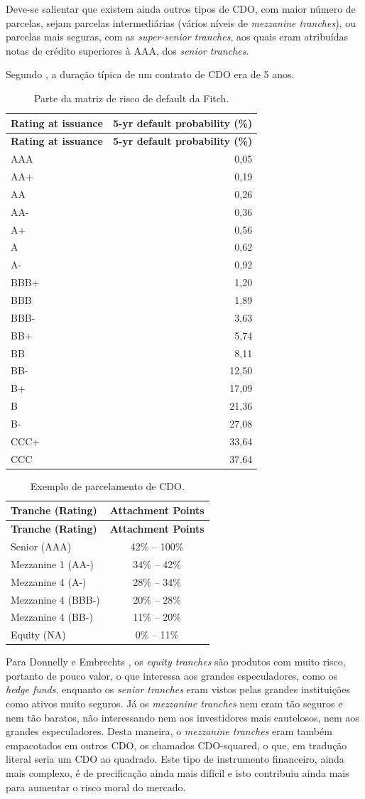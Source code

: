 \documentclass[
	12pt,				%
	oneside,			%
	a4paper,			%
	chapter=TITLE,		%
	section=TITLE,		%
	english,			%
	brazil				%
	]{abntex2}
\begin{document}
Deve-se salientar que existem ainda outros tipos de \gls{CDO}, com maior
número de parcelas, sejam parcelas intermediárias (vários níveis de
\emph{mezzanine tranches}), ou parcelas mais seguras, com as
\emph{super-senior tranches}, aos quais eram atribuídas notas de crédito
superiores à AAA, dos \emph{senior tranches}.

Segundo \textcite{watts}, a duração típica de um contrato de \gls{CDO}
era de 5 anos.
\begin{longtable}[]{@{}lr@{}}
\caption{Parte da matriz de risco de default da Fitch.}\tabularnewline
\toprule
\textbf{Rating at issuance} & \textbf{5-yr default probability
(\%)}\tabularnewline
\midrule
\endfirsthead
\toprule
\textbf{Rating at issuance} & \textbf{5-yr default probability
(\%)}\tabularnewline
\midrule
\endhead
AAA & 0,05\tabularnewline
AA+ & 0,19\tabularnewline
AA & 0,26\tabularnewline
AA- & 0,36\tabularnewline
A+ & 0,56\tabularnewline
A & 0,62\tabularnewline
A- & 0,92\tabularnewline
BBB+ & 1,20\tabularnewline
BBB & 1,89\tabularnewline
BBB- & 3,63\tabularnewline
BB+ & 5,74\tabularnewline
BB & 8,11\tabularnewline
BB- & 12,50\tabularnewline
B+ & 17,09\tabularnewline
B & 21,36\tabularnewline
B- & 27,08\tabularnewline
CCC+ & 33,64\tabularnewline
CCC & 37,64\tabularnewline
\bottomrule
\end{longtable}
\begin{longtable}[]{@{}lc@{}}
\caption{Exemplo de parcelamento de \gls{CDO}.}\tabularnewline
\toprule
\textbf{Tranche (Rating)} & \textbf{Attachment Points}\tabularnewline
\midrule
\endfirsthead
\toprule
\textbf{Tranche (Rating)} & \textbf{Attachment Points}\tabularnewline
\midrule
\endhead
Senior (AAA) & 42\% -- 100\%\tabularnewline
Mezzanine 1 (AA-) & 34\% -- 42\%\tabularnewline
Mezzanine 4 (A-) & 28\% -- 34\%\tabularnewline
Mezzanine 4 (BBB-) & 20\% -- 28\%\tabularnewline
Mezzanine 4 (BB-) & 11\% -- 20\%\tabularnewline
Equity (NA) & 0\% -- 11\%\tabularnewline
\bottomrule
\end{longtable}
Para Donnelly e Embrechts \autocite[20]{devil}, os \emph{equity
tranches} são produtos com muito risco, portanto de pouco valor, o que
interessa aos grandes especuladores, como os \emph{hedge funds},
enquanto os \emph{senior tranches} eram vistos pelas grandes
instituições como ativos muito seguros. Já os \emph{mezzanine tranches}
nem eram tão seguros e nem tão baratos, não interessando nem aos
investidores mais cautelosos, nem aos grandes especuladores. Desta
maneira, o \emph{mezzanine tranches} eram também empacotados em outros
\gls{CDO}, os chamados \gls{CDO}-squared, o que, em tradução literal
seria um \gls{CDO} ao quadrado. Este tipo de instrumento financeiro,
ainda mais complexo, é de precificação ainda mais difícil e isto
contribuiu ainda mais para aumentar o risco moral do mercado.
\end{document}
